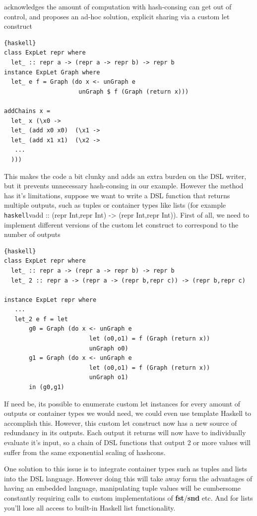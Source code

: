 \documentclass[runningheads]{llncs}
\begin{document}
\cite{kiselyov:sharing} acknowledges the amount of computation with hash-consing
can get out of control, and proposes an ad-hoc solution, explicit sharing via a
custom let construct
\begin{lstlisting}{haskell}
class ExpLet repr where
  let_ :: repr a -> (repr a -> repr b) -> repr b
instance ExpLet Graph where
  let_ e f = Graph (do x <- unGraph e
                     unGraph $ f (Graph (return x)))

addChains x =
  let_ x (\x0 ->
  let_ (add x0 x0)  (\x1 ->
  let_ (add x1 x1)  (\x2 ->
   ...
  )))
\end{lstlisting}
This makes the code a bit clunky and adds an extra burden on the DSL writer, but
it prevents unnecessary hash-consing in our example. However the method has it's
limitations, suppose we want to write a DSL function that returns multiple
outputs, such as tuples or container types like lists (for example
\lstinline{haskell}{vadd :: (repr Int,repr Int) -> (repr Int,repr Int)}). %
First of all, we need to implement different versions of the custom let construct to
correspond to the number of outputs
\begin{lstlisting}{haskell}
class ExpLet repr where
  let_ :: repr a -> (repr a -> repr b) -> repr b
  let_ 2 :: repr a -> (repr a -> (repr b,repr c)) -> (repr b,repr c)

instance ExpLet repr where
   ...
   let_2 e f = let
       g0 = Graph (do x <- unGraph e
                        let (o0,o1) = f (Graph (return x))
                        unGraph o0)
       g1 = Graph (do x <- unGraph e
                        let (o0,o1) = f (Graph (return x))
                        unGraph o1)
       in (g0,g1)
\end{lstlisting}
If need be, its possible to enumerate custom let instances for every amount of
outputs or container types we would need, we could even use template Haskell to
accomplish this. However, this custom let construct now has a new source of
redundancy in its outputs. Each output it returns will now have to individually
evaluate it's input, so a chain of DSL functions that output 2 or more values
will suffer from the same exponential scaling of hashcons.

One solution to this issue is to integrate container types such as tuples and
lists into the DSL language. However doing this will take away form the
advantages of having an embedded language, manipulating tuple values will be
cumbersome constantly requiring calls to custom implementations of {\bf
  fst}/{\bf snd} etc. And for lists you'll lose all access to built-in Haskell
list functionality.
\end{document}
